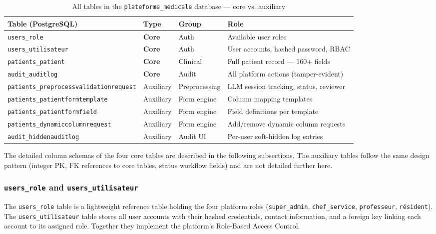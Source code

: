 \documentclass[12pt,a4paper,twoside]{report}
\begin{document}
\begin{table}[htbp]
\centering
\caption{All tables in the \texttt{plateforme\_medicale} database — core vs. auxiliary}
\label{tab:db_tables_overview}
\small
\begin{tabularx}{\textwidth}{p{5.5cm}p{1.6cm}p{2.2cm}X}
\toprule
\textbf{Table (PostgreSQL)} & \textbf{Type} & \textbf{Group} & \textbf{Role} \\
\midrule
\rowcolor{teal!8}
\texttt{users\_role}              & \textbf{Core} & Auth & Available user roles \\
\rowcolor{teal!8}
\texttt{users\_utilisateur}       & \textbf{Core} & Auth & User accounts, hashed password, RBAC \\
\rowcolor{teal!8}
\texttt{patients\_patient}        & \textbf{Core} & Clinical & Full patient record — 160+ fields \\
\rowcolor{teal!8}
\texttt{audit\_auditlog}          & \textbf{Core} & Audit & All platform actions (tamper-evident) \\
\midrule
\texttt{patients\_preprocessvalida\-tionrequest} & Auxiliary & Preprocessing & LLM session tracking, status, reviewer \\
\texttt{patients\_patientformtemplate}         & Auxiliary & Form engine   & Column mapping templates \\
\texttt{patients\_patientformfield}            & Auxiliary & Form engine   & Field definitions per template \\
\texttt{patients\_dynamiccolumnre\-quest}        & Auxiliary & Form engine   & Add/remove dynamic column requests \\
\texttt{audit\_hiddenauditlog}                 & Auxiliary & Audit UI      & Per-user soft-hidden log entries \\
\bottomrule
\end{tabularx}
\end{table}

The detailed column schemas of the four core tables are described in the following subsections. The auxiliary tables follow the same design pattern (integer PK, FK references to core tables, status workflow fields) and are not detailed further here.

\subsubsection{\texttt{users\_role} and \texttt{users\_utilisateur}}

The \texttt{users\_role} table is a lightweight reference table holding the four platform roles (\texttt{super\_admin}, \texttt{chef\_service}, \texttt{professeur}, \texttt{résident}). The \texttt{users\_utilisateur} table stores all user accounts with their hashed credentials, contact information, and a foreign key linking each account to its assigned role. Together they implement the platform's Role-Based Access Control.
\end{document}
